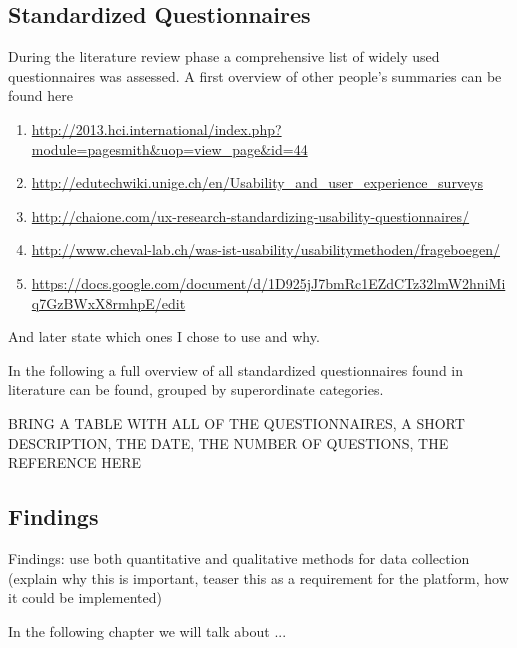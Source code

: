 




\subsection{Standardized Questionnaires}


		During the literature review phase a comprehensive list of widely used questionnaires was assessed. A first overview of other people's summaries can be found here

		\begin{enumerate}
		\item \url{http://2013.hci.international/index.php?module=pagesmith&uop=view_page&id=44}
		\item \url{http://edutechwiki.unige.ch/en/Usability_and_user_experience_surveys}
		\item \url{http://chaione.com/ux-research-standardizing-usability-questionnaires/}
		\item \url{http://www.cheval-lab.ch/was-ist-usability/usabilitymethoden/frageboegen/}
		\item \url{https://docs.google.com/document/d/1D925jJ7bmRc1EZdCTz32lmW2hniMiq7GzBWxX8rmhpE/edit}
		\end{enumerate}

	And later state which ones I chose to use and why.

		In the following a full overview of all standardized questionnaires found in literature can be found, grouped by superordinate categories.

		BRING A TABLE WITH ALL OF THE QUESTIONNAIRES, A SHORT DESCRIPTION, THE DATE, THE NUMBER OF QUESTIONS, THE REFERENCE HERE


\subsection{Findings}

	Findings: use both quantitative and qualitative methods for data collection (explain why this is important, teaser this as a requirement for the platform, how it could be implemented)




In the following chapter we will talk about ...
